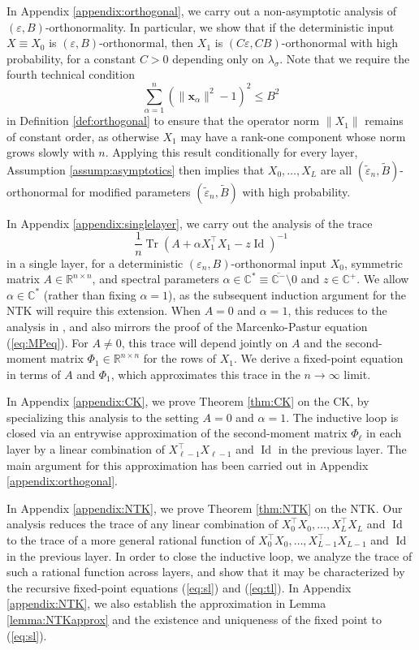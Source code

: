 \documentclass{article}
\theoremstyle{definition}
\newcommand{\R}{\mathbb{R}}
\newcommand{\C}{\mathbb{C}}
\newcommand{\Id}{\operatorname{Id}}
\newcommand{\Tr}{\operatorname{Tr}}
\newcommand{\x}{\mathbf{x}}
\renewcommand{\a}{\alpha}
\newcommand{\eps}{\varepsilon}
\newcommand{\1}{\mathbf{1}}
\begin{document}
In Appendix \ref{appendix:orthogonal}, we carry out a non-asymptotic analysis
of $(\eps,B)$-orthonormality. In particular, we show that if the deterministic
input $X \equiv X_0$ is $(\eps,B)$-orthonormal, then $X_1$ is
$(C\eps,CB)$-orthonormal with high probability, for a constant $C>0$ depending
only on $\lambda_\sigma$. Note that we require the fourth technical condition
\[\sum_{\a=1}^n (\|\x_\a\|^2-1)^2 \leq B^2\]
in Definition \ref{def:orthogonal} to ensure that the operator norm $\|X_1\|$
remains of constant order, as otherwise $X_1$ may have a rank-one component
whose norm grows slowly with $n$. Applying this result conditionally for
every layer, Assumption \ref{assump:asymptotics} then implies that
$X_0,\ldots,X_L$ are all $(\tilde{\eps}_n,\tilde{B})$-orthonormal for modified
parameters $(\tilde{\eps}_n,\tilde{B})$ with high probability.

In Appendix \ref{appendix:singlelayer}, we carry out the analysis of the trace
\[\frac{1}{n}\Tr(A+\alpha X_1^\top X_1-z\Id)^{-1}\]
in a single layer, for a deterministic
$(\eps_n,B)$-orthonormal input $X_0$, symmetric matrix $A \in
\R^{n \times n}$, and spectral parameters $\alpha \in \C^* \equiv
\overline{\C^-} \setminus 0$ and $z \in \C^+$. We allow
$\alpha \in \C^*$ (rather than fixing $\alpha=1$), 
as the subsequent induction argument for the NTK will require this extension.
When $A=0$ and $\alpha=1$, this
reduces to the analysis in \cite{louart2018random}, and also mirrors the proof 
of the Marcenko-Pastur equation (\ref{eq:MPeq}). For $A \neq 0$,
this trace will depend jointly on $A$ and the second-moment matrix
$\Phi_1 \in \R^{n \times n}$ for the rows of $X_1$. We derive a 
fixed-point equation in terms of $A$ and $\Phi_1$, which approximates this
trace in the $n \to \infty$ limit. 

In Appendix \ref{appendix:CK}, we prove Theorem \ref{thm:CK} on the CK,
by specializing this analysis to the setting $A=0$ and $\alpha=1$.
The inductive loop
is closed via an entrywise approximation of the second-moment matrix
$\Phi_\ell$ in each layer by a linear combination of
$X_{\ell-1}^\top X_{\ell-1}$ and $\Id$ in the previous layer.
The main argument for this approximation
has been carried out in Appendix \ref{appendix:orthogonal}.

In Appendix \ref{appendix:NTK}, we prove Theorem \ref{thm:NTK} on the NTK.
Our analysis reduces the trace of any
linear combination of $X_0^\top X_0,\ldots,X_L^\top X_L$ and $\Id$ to the trace of a
more general rational function of $X_0^\top X_0,\ldots,X_{L-1}^\top X_{L-1}$ and $\Id$ in the previous layer. In order
to close the inductive loop, we analyze the trace of such a rational function
across layers, and show that it may be characterized by the recursive
fixed-point equations (\ref{eq:sl}) and (\ref{eq:tl}). 
In Appendix \ref{appendix:NTK}, we also establish the
approximation in Lemma \ref{lemma:NTKapprox} and the existence and uniqueness of
the fixed point to (\ref{eq:sl}).
\end{document}
